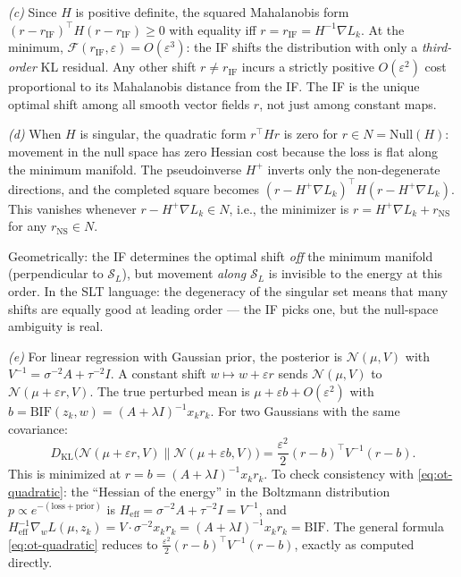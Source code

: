 \documentclass[11pt]{article}
\begin{document}
\begin{solution}[ex:bif-ot]
\textit{(c)} Since $H$ is positive definite, the squared Mahalanobis form $(r-r_{\mathrm{IF}})^\top H(r-r_{\mathrm{IF}}) \ge 0$ with equality iff $r = r_{\mathrm{IF}} = H^{-1}\nabla L_k$. At the minimum, $\mathcal{F}(r_{\mathrm{IF}},\varepsilon) = O(\varepsilon^3)$: the IF shifts the distribution with only a \emph{third-order} KL residual. Any other shift $r\ne r_{\mathrm{IF}}$ incurs a strictly positive $O(\varepsilon^2)$ cost proportional to its Mahalanobis distance from the IF. The IF is the unique optimal shift among all smooth vector fields $r$, not just among constant maps.

\textit{(d)} When $H$ is singular, the quadratic form $r^\top Hr$ is zero for $r\in N = \mathrm{Null}(H)$: movement in the null space has zero Hessian cost because the loss is flat along the minimum manifold. The pseudoinverse $H^+$ inverts only the non-degenerate directions, and the completed square becomes $(r - H^+\nabla L_k)^\top H(r - H^+\nabla L_k)$. This vanishes whenever $r - H^+\nabla L_k \in N$, i.e., the minimizer is $r = H^+\nabla L_k + r_{\mathrm{NS}}$ for any $r_{\mathrm{NS}}\in N$.

Geometrically: the IF determines the optimal shift \emph{off} the minimum manifold (perpendicular to $\mathcal{S}_L$), but movement \emph{along} $\mathcal{S}_L$ is invisible to the energy at this order. In the SLT language: the degeneracy of the singular set means that many shifts are equally good at leading order --- the IF picks one, but the null-space ambiguity is real.

\textit{(e)} For linear regression with Gaussian prior, the posterior is $\mathcal{N}(\mu,V)$ with $V^{-1} = \sigma^{-2}A + \tau^{-2}I$. A constant shift $w\mapsto w+\varepsilon r$ sends $\mathcal{N}(\mu,V)$ to $\mathcal{N}(\mu+\varepsilon r,V)$. The true perturbed mean is $\mu + \varepsilon b + O(\varepsilon^2)$ with $b = \mathrm{BIF}(z_k,w) = (A+\lambda I)^{-1}x_k r_k$. For two Gaussians with the same covariance:
\[
  D_{\mathrm{KL}}\bigl(\mathcal{N}(\mu+\varepsilon r,V)\|\mathcal{N}(\mu+\varepsilon b,V)\bigr) = \frac{\varepsilon^2}{2}(r-b)^\top V^{-1}(r-b).
\]
This is minimized at $r = b = (A+\lambda I)^{-1}x_k r_k$. To check consistency with \eqref{eq:ot-quadratic}: the ``Hessian of the energy'' in the Boltzmann distribution $p \propto e^{-(\text{loss}+\text{prior})}$ is $H_{\mathrm{eff}} = \sigma^{-2}A + \tau^{-2}I = V^{-1}$, and $H_{\mathrm{eff}}^{-1}\nabla_w L(\mu,z_k) = V\cdot\sigma^{-2}x_k r_k = (A+\lambda I)^{-1}x_k r_k = \mathrm{BIF}$. The general formula \eqref{eq:ot-quadratic} reduces to $\frac{\varepsilon^2}{2}(r-b)^\top V^{-1}(r-b)$, exactly as computed directly.


\end{solution}
\end{document}
